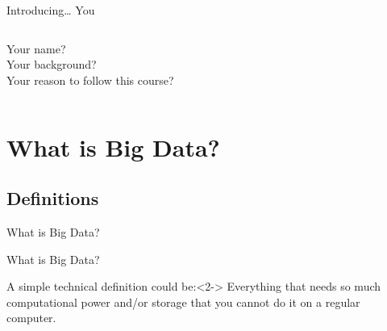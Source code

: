\documentclass{beamer}
\begin{document}
\begin{frame}{Introducing\ldots}
	{\huge{You}}
	\small{}
	\begin{columns}
		Your name?\\
		Your background?\\
		Your reason to follow this course?
	\end{columns}
\end{frame}





\section{What is Big Data?}
\subsection{Definitions}

\begin{frame}
What is Big Data?
\end{frame}


{
\begin{frame}[plain]
\end{frame}
}



\begin{frame}{What is Big Data?}
\begin{block}{A simple technical definition could be:}<2->
Everything that needs so much computational power and/or storage that you cannot do it on a regular computer.
\end{block}
\end{frame}
\end{document}
